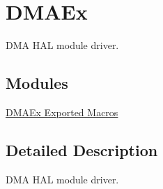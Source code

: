 \hypertarget{group___d_m_a_ex}{}\section{D\+M\+A\+Ex}
\label{group___d_m_a_ex}


D\+MA H\+AL module driver.  


\subsection*{Modules}
\begin{DoxyCompactItemize}
\item 
\hyperlink{group___d_m_a_ex___exported___macros}{D\+M\+A\+Ex Exported Macros}
\end{DoxyCompactItemize}


\subsection{Detailed Description}
D\+MA H\+AL module driver. 

